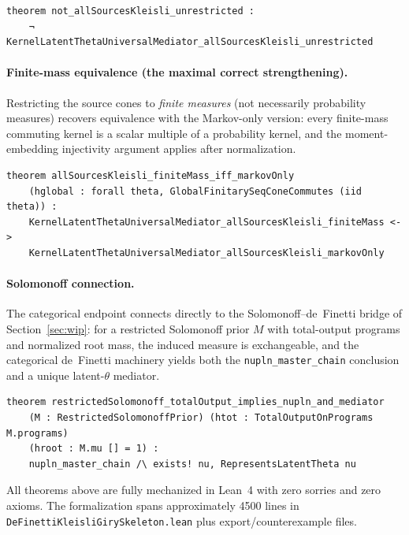 \documentclass[]{article}
\begin{document}
\begin{lstlisting}[basicstyle=\scriptsize\ttfamily,frame=single,numbers=none]
theorem not_allSourcesKleisli_unrestricted :
    ¬ KernelLatentThetaUniversalMediator_allSourcesKleisli_unrestricted
\end{lstlisting}

\paragraph{Finite-mass equivalence (the maximal correct strengthening).}
Restricting the source cones to \emph{finite measures} (not necessarily
probability measures) recovers equivalence with the Markov-only version:
every finite-mass commuting kernel is a scalar multiple of a probability
kernel, and the moment-embedding injectivity argument applies after
normalization.

\begin{lstlisting}[basicstyle=\scriptsize\ttfamily,frame=single,numbers=none]
theorem allSourcesKleisli_finiteMass_iff_markovOnly
    (hglobal : forall theta, GlobalFinitarySeqConeCommutes (iid theta)) :
    KernelLatentThetaUniversalMediator_allSourcesKleisli_finiteMass <->
    KernelLatentThetaUniversalMediator_allSourcesKleisli_markovOnly
\end{lstlisting}

\paragraph{Solomonoff connection.}
The categorical endpoint connects directly to the Solomonoff--de~Finetti
bridge of Section~\ref{sec:wip}: for a restricted Solomonoff prior $M$ with
total-output programs and normalized root mass, the induced measure is
exchangeable, and the categorical de~Finetti machinery yields both the
\texttt{nupln\_master\_chain} conclusion and a unique latent-$\theta$ mediator.

\begin{lstlisting}[basicstyle=\scriptsize\ttfamily,frame=single,numbers=none]
theorem restrictedSolomonoff_totalOutput_implies_nupln_and_mediator
    (M : RestrictedSolomonoffPrior) (htot : TotalOutputOnPrograms M.programs)
    (hroot : M.mu [] = 1) :
    nupln_master_chain /\ exists! nu, RepresentsLatentTheta nu
\end{lstlisting}

All theorems above are fully mechanized in Lean~4 with zero sorries and zero
axioms.  The formalization spans approximately 4500 lines in
\texttt{DeFinettiKleisliGirySkeleton.lean} plus export/counterexample files.
\end{document}
